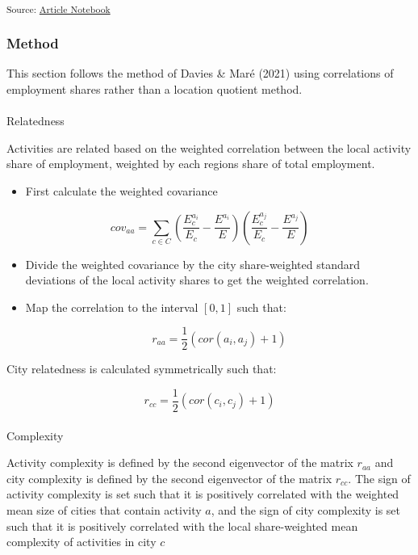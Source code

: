 \documentclass[
]{agujournal2019}
\makeatletter
\let\oldparagraph\paragraph
\renewcommand{\paragraph}{
    \@ifstar
      \xxxParagraphStar
      \xxxParagraphNoStar
  }
\newcommand{\xxxParagraphStar}[1]{\oldparagraph*{#1}\mbox{}}
\newcommand{\xxxParagraphNoStar}[1]{\oldparagraph{#1}\mbox{}}
\providecommand{\tightlist}{%
  \setlength{\itemsep}{0pt}\setlength{\parskip}{0pt}}\usepackage{longtable,booktabs,array}
\makeatother
\begin{document}
\textsubscript{Source:
\href{https://aiti-flinders.github.io/sirp-complexity/index-preview.html}{Article
Notebook}}

\subsubsection{Method}\label{method}

This section follows the method of Davies \& Maré (2021) using
correlations of employment shares rather than a location quotient
method.

\paragraph{Relatedness}\label{relatedness}

Activities are related based on the weighted correlation between the
local activity share of employment, weighted by each regions share of
total employment.

\begin{itemize}
\tightlist
\item
  First calculate the weighted covariance
\end{itemize}

\[
cov_{aa} = \sum_{c \in C} (\frac{E_c^{a_i}}{E_c}-\frac{E^{a_i}}{E})(\frac{E_c^{a_j}}{E_c}-\frac{E^{a_j}}{E})
\]

\begin{itemize}
\item
  Divide the weighted covariance by the city share-weighted standard
  deviations of the local activity shares to get the weighted
  correlation.
\item
  Map the correlation to the interval \([0,1]\) such that:

  \[
  r_{aa} = \frac{1}{2}(cor(a_i, a_j) + 1)
  \]
\end{itemize}

City relatedness is calculated symmetrically such that:

\[
r_{cc} = \frac{1}{2}(cor(c_i, c_j) + 1)
\]

\paragraph{Complexity}\label{complexity}

Activity complexity is defined by the second eigenvector of the matrix
\(r_{aa}\) and city complexity is defined by the second eigenvector of
the matrix \(r_{cc}\). The sign of activity complexity is set such that
it is positively correlated with the weighted mean size of cities that
contain activity \(a\), and the sign of city complexity is set such that
it is positively correlated with the local share-weighted mean
complexity of activities in city \(c\)
\end{document}
